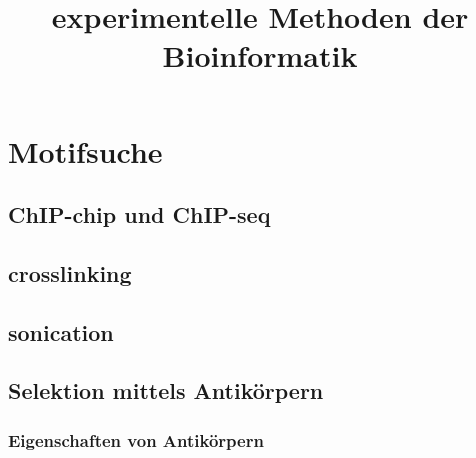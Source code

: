 \documentclass[12pt,a4paper]{article}
\title{\Huge\textbf{experimentelle Methoden der Bioinformatik}}
\author{}
\date{}
\begin{document}
\begin{titlepage}

\maketitle
\thispagestyle{empty}
\end{titlepage}
\newpage

\begin{titlepage}
\tableofcontents
\thispagestyle{empty}
\end{titlepage}
\newpage



\newpage



\newpage



\newpage



\newpage



\newpage



\newpage



\section{Motifsuche}

\subsection{ChIP-chip und ChIP-seq}

\subsection{crosslinking}

\subsection{sonication}

\subsection{Selektion mittels Antikörpern}

\subsubsection{Eigenschaften von Antikörpern}
\end{document}
